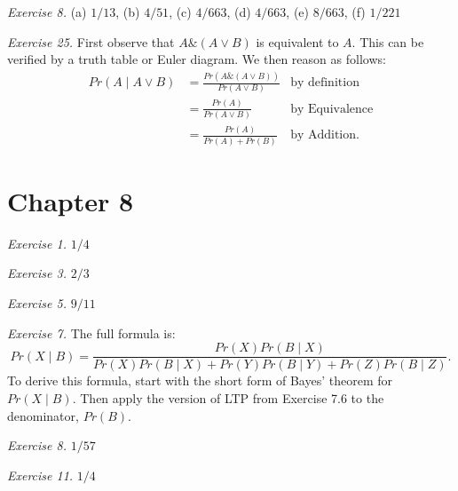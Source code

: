 \documentclass[justified]{tufte-book}
\newcommand{\given}{\mid}
\renewcommand{\wedge}{\mathbin{\&}}
\newcommand{\p}{Pr}
\begin{document}
\vspace{.5em}

\noindent
\emph{Exercise 8.} (a) \(1/13\), (b) \(4/51\), (c) \(4/663\), (d) \(4/663\), (e) \(8/663\), (f) \(1/221\)

\vspace{.5em}

\noindent
\emph{Exercise 25.} First observe that \(A \wedge (A \vee B)\) is equivalent to \(A\). This can be verified by a truth table or Euler diagram. We then reason as follows:
\[
  \begin{aligned}
    \p(A \given A \vee B) 
      & = \frac{\p(A \wedge (A \vee B))}{\p(A \vee B)}  & \text{by definition}\\
      & = \frac{\p(A)}{\p(A \vee B)}                    & \text{by Equivalence}\\
      & = \frac{\p(A)}{\p(A) + \p(B)}                   & \text{by Addition.}
  \end{aligned}
  \]

\hypertarget{chapter-8}{%
\section*{Chapter 8}\label{chapter-8}}

\noindent
\emph{Exercise 1.} \(1/4\)

\vspace{.5em}

\noindent
\emph{Exercise 3.} \(2/3\)

\vspace{.5em}

\noindent
\emph{Exercise 5.} \(9/11\)

\vspace{.5em}

\noindent
\emph{Exercise 7.} The full formula is:
\[
    \p(X \given B) 
      = \frac{\p(X)\p(B \given X)}{\p(X)\p(B \given X) + \p(Y)\p(B \given Y) + \p(Z)\p(B \given Z)}.
  \]
To derive this formula, start with the short form of Bayes' theorem for \(\p(X \given B)\). Then apply the version of LTP from Exercise 7.6 to the denominator, \(\p(B)\).

\vspace{.5em}

\noindent
\emph{Exercise 8.} \(1/57\)

\vspace{.5em}

\noindent
\emph{Exercise 11.} \(1/4\)
\end{document}
